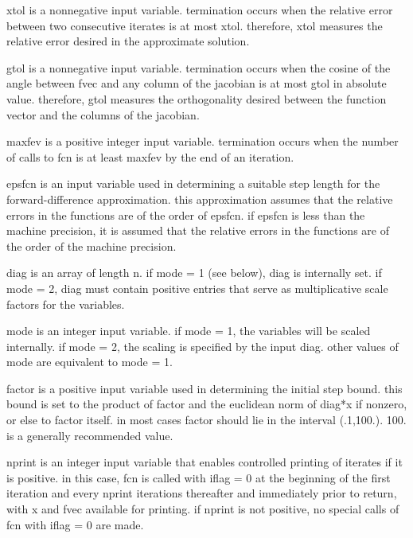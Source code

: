 \documentclass[11pt,twoside,nolof]{starlink}
\begin{document}
\begin{terminalv}
       xtol is a nonnegative input variable. termination
         occurs when the relative error between two consecutive
         iterates is at most xtol. therefore, xtol measures the
         relative error desired in the approximate solution.

       gtol is a nonnegative input variable. termination
         occurs when the cosine of the angle between fvec and
         any column of the jacobian is at most gtol in absolute
         value. therefore, gtol measures the orthogonality
         desired between the function vector and the columns
         of the jacobian.

       maxfev is a positive integer input variable. termination
         occurs when the number of calls to fcn is at least
         maxfev by the end of an iteration.

       epsfcn is an input variable used in determining a suitable
         step length for the forward-difference approximation. this
         approximation assumes that the relative errors in the
         functions are of the order of epsfcn. if epsfcn is less
         than the machine precision, it is assumed that the relative
         errors in the functions are of the order of the machine
         precision.

       diag is an array of length n. if mode = 1 (see
         below), diag is internally set. if mode = 2, diag
         must contain positive entries that serve as
         multiplicative scale factors for the variables.

       mode is an integer input variable. if mode = 1, the
         variables will be scaled internally. if mode = 2,
         the scaling is specified by the input diag. other
         values of mode are equivalent to mode = 1.

       factor is a positive input variable used in determining the
         initial step bound. this bound is set to the product of
         factor and the euclidean norm of diag*x if nonzero, or else
         to factor itself. in most cases factor should lie in the
         interval (.1,100.). 100. is a generally recommended value.

       nprint is an integer input variable that enables controlled
         printing of iterates if it is positive. in this case,
         fcn is called with iflag = 0 at the beginning of the first
         iteration and every nprint iterations thereafter and
         immediately prior to return, with x and fvec available
         for printing. if nprint is not positive, no special calls
         of fcn with iflag = 0 are made.


\end{terminalv}
\end{document}
